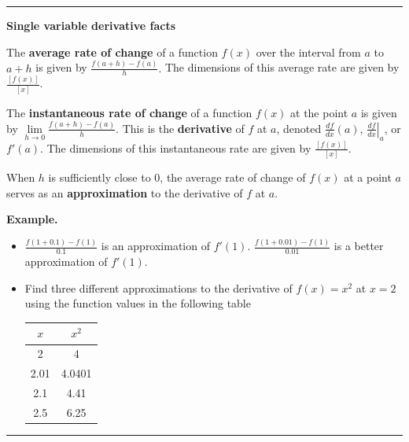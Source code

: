\documentclass[12pt,letterpaper,noanswers]{exam}
\begin{document}
\vspace{0.2cm}
\hrule
\vspace{0.2cm}

\noindent\textbf{Single variable derivative facts}

\begin{tcolorbox}

The \textbf{average rate of change} of a function $f(x)$ over the interval from $a$ to $a+h$ is given by $ \frac{f(a+h) - f(a)}{h}.$  The dimensions of this average rate are given by $\frac{[f(x)]}{[x]}$.

The \textbf{instantaneous rate of change} of a function $f(x)$ at the point $a$ is given by $ \lim\limits_{h\rightarrow 0} \frac{f(a+h) - f(a)}{h}.$  This is the \textbf{derivative} of $f$ at $a$, denoted $\frac{df}{dx}(a)$, $\left.\frac{df}{dx}\right\vert_a$, or $f'(a)$.  The dimensions of this instantaneous rate are given by $\frac{[f(x)]}{[x]}$.

When $h$ is sufficiently close to $0$, the average rate of change of $f(x)$ at a point $a$ serves as an \textbf{approximation} to the derivative of $f$ at $a$.
\end{tcolorbox}

\noindent\textbf{Example.}
\begin{itemize}
    \item $\frac{f(1+0.1)-f(1)}{0.1}$ is an approximation of $f'(1).$  $\frac{f(1+0.01)-f(1)}{0.01}$ is a better approximation of $f'(1)$.
\item Find three different approximations to the derivative of $f(x) = x^2$ at $x = 2$ using the function values in the following table

\begin{tabular}{|c| c|}
\hline
$x$ & $x^2$\\
\hline
\hline
2 & 4 \\
2.01 & 4.0401 \\
2.1 & 4.41 \\
2.5 & 6.25 \\
\hline
\end{tabular}

\end{itemize}

\vspace{0.2cm}
\hrule
\vspace{0.2cm}


\end{document}
